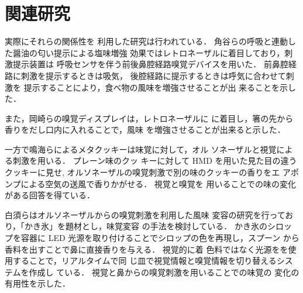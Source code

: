 \section{関連研究}

実際にそれらの関係性を
利用した研究は行われている．
角谷らの呼吸と連動した醤油の匂い提示による塩味増強
効果\cite{enmi}ではレトロネーザルに着目しており，刺激提示装置は
呼吸センサを伴う前後鼻腔経路嗅覚デバイスを用いた． 
前鼻腔経路に刺激を提示するときは吸気，
後腔経路に提示するときは呼気に合わせて刺激を
提示することにより，食べ物の風味を増強させることが出
来ることを示した．


また，岡崎らの嗅覚ディスプレイ\cite{hasi}は，レトロネーザルに
に着目し，箸の先から香りをだし口内に入れることで，風味
を増強させることが出来ると示した．


一方で鳴海らによるメタクッキー\cite{narumi2}は味覚に対して，オル
ソネーザルと視覚による刺激を用いる． プレーン味のクッ
キーに対して HMD を用いた見た目の違うクッキーに見せ,
オルソネーザルの嗅覚刺激で別の味のクッキーの香りをエ
アポンプによる空気の送風で香りかがせる． 視覚と嗅覚を
用いることでの味の変化がある回答を得ている．


白須らはオルソネーザルからの嗅覚刺激を利用した風味
変容の研究\cite{fan}\cite{pomp}を行っており，「かき氷」を題材とし，味覚変容
の手法を検討している． かき氷のシロップを容器に LED
光源を取り付けることでシロップの色を再現し，スプーン
から香料を出すことで鼻に直接香りを与える． 視覚的に着
色料ではなく光源をを使用することで，リアルタイムで同
じ皿で視覚情報と嗅覚情報を切り替えるシステムを作成し
ている． 視覚と鼻からの嗅覚刺激を用いることでの味覚の
変化の有用性を示した．
